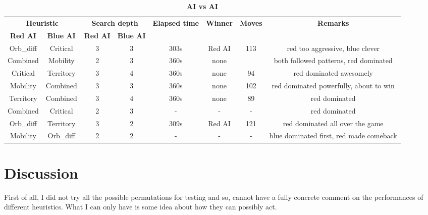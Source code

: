 \documentclass[a4paper, 13pt]{article}
\begin{document}
		\vspace{0.3cm}
		
		\begin{table}[!]
			\centering
			\caption{\textbf{AI vs AI}}
			\vspace{0.2cm}
			\small
			\begin{tabular}{| c | c | c | c | c | c | c | c |}
        			\hline
        			\multicolumn{2}{|c|}{\textbf{Heuristic}} & 
        			\multicolumn{2}{c|}{\textbf{Search depth}} & 
        			\multirow{2}{*}{\textbf{Elapsed time}} & 
        			\multirow{2}{*}{\textbf{Winner}} & 
        			\multirow{2}{*}{\textbf{Moves}} & 
        			\multirow{2}{*}{\textbf{Remarks}} \\
        			\cline{1-4}
        			\textbf{Red AI} & \textbf{Blue AI} & \textbf{Red AI} 						& \textbf{Blue AI} & & & & \\
        			\hline
        			Orb\_diff & Critical & 3 & 3 & 303s & Red AI & 113 & red too aggressive, blue clever\\
        			\hline
        			Combined & Mobility & 2 & 3 & 360s & none &  & both followed patterns, red dominated \\
        			\hline
        			Critical & Territory & 3 & 4 & 360s & none & 94 & red dominated awesomely\\
        			\hline
        			Mobility & Combined & 3 & 3 & 360s & none & 102 & red dominated powerfully, about to win \\
        			\hline
        			Territory & Combined & 3 & 4 & 360s & none & 89 & red dominated \\
        			\hline
        			Combined & Critical & 2 & 3 & - & - & - & red dominated \\
        			\hline
        			Orb\_diff & Territory & 3 & 2 & 309s & Red AI & 121 & red dominated all over the game \\
        			\hline
        			Mobility & Orb\_diff & 2 & 2 & - & - & - & blue dominated first, red made comeback \\
        			\hline
    			\end{tabular}
		\end{table}
		
	\vspace{0.5cm}
	\section*{Discussion}
	
	First of all, I did not try all the possible permutations for testing and so, cannot have a fully concrete comment on the performances of different heuristics. What I can only have is some idea about how they can possibly act.
	
\end{document}

